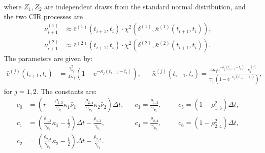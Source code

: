 \documentclass[]{interact}
\theoremstyle{plain}%
\theoremstyle{definition}
\theoremstyle{remark}
\begin{document}
where $Z_1, Z_2$ are independent draws from the standard normal distribution, and the two CIR processes are
\begin{align*}
    \nu_{i+1}^{(1)} &\approx \bar{c}^{(1)}(t_{i+1}, t_{i}) \cdot \chi^{2} \left(\delta^{(1)}, \bar{\kappa}^{(1)} \left(t_{i+1}, t_{i}\right)\right), \\
    \nu_{i+1}^{(2)} &\approx \bar{c}^{(2)}(t_{i+1}, t_{i}) \cdot \chi^{2} \left(\delta^{(2)}, \bar{\kappa}^{(2)} \left(t_{i+1}, t_{i}\right)\right).
\end{align*}
The parameters are given by:
\begin{align*}
\bar{c}^{(j)}\left(t_{i+1}, t_{i}\right) &= \frac{\gamma_{\nu_{j}}^{2}}{4 \kappa_{j}} \left(1 - \mathrm{e}^{-\kappa_{j}\left(t_{i+1} - t_{i}\right)}\right), &&
\bar{\kappa}^{(j)}\left(t_{i+1}, t_{i}\right) = \frac{4 \kappa_{j} \mathrm{e}^{-\kappa_{j}\left(t_{i+1} - t_{i}\right)} \cdot \nu_{i}^{(j)}}{\gamma_{\nu_{j}}^{2} \left(1 - \mathrm{e}^{-\kappa_{j}\left(t_{i+1} - t_{i}\right)}\right)},
\end{align*}
for $j = 1, 2$. The constants are:
$$
\begin{aligned}
c_0 &= \left(r - \frac{\rho_{1,3}}{\gamma_{\nu_{1}}} \kappa_1 \bar{\nu}_{1} - \frac{\rho_{2,4}}{\gamma_{\nu_{2}}} \kappa_2 \bar{\nu}_{2}\right) \Delta t, &&
c_3 = \frac{\rho_{1,3}}{\gamma_{\nu_{1}}}, &&& 
c_5 = \left(1 - \rho_{1,3}^{2}\right) \Delta t, \\
c_1 &= \left(\frac{\rho_{1,3}}{\gamma_{\nu_{1}}} \kappa_1 - \frac{1}{2}\right) \Delta t - \frac{\rho_{1,3}}{\gamma_{\nu_{1}}}, &&
c_4 = \frac{\rho_{2,4}}{\gamma_{\nu_{2}}}, &&& 
c_6 = \left(1 - \rho_{2,4}^{2}\right) \Delta t, \\
c_2 &= \left(\frac{\rho_{2,4}}{\gamma_{\nu_{2}}} \kappa_2 - \frac{1}{2}\right) \Delta t - \frac{\rho_{2,4}}{\gamma_{\nu_{2}}}.
\end{aligned}
$$





\end{document}
